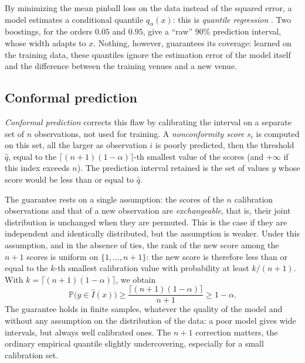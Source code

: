 \documentclass[11pt,a4paper]{article}
\begin{document}
By minimizing the mean pinball loss on the data instead of the squared error, a model estimates a conditional quantile
$\hat q_\alpha(x)$: this is \emph{quantile regression} \citep{koenker1978}. Two boostings, for the orders $0.05$ and
$0.95$, give a ``raw'' 90\% prediction interval, whose width adapts to $x$. Nothing, however, guarantees its coverage:
learned on the training data, these quantiles ignore the estimation error of the model itself and the difference
between the training venues and a new venue.

\subsection{Conformal prediction}\label{sec:conformal}

\emph{Conformal prediction} \citep{vovk2005} corrects this flaw by calibrating the interval on a separate set of $n$
observations, not used for training. A \emph{nonconformity score} $s_i$ is computed on this set, all the larger as
observation $i$ is poorly predicted, then the threshold $\hat q$, equal to the $\lceil (n+1)(1-\alpha)\rceil$-th
smallest value of the scores (and $+\infty$ if this index exceeds $n$). The prediction interval retained is the set of
values $y$ whose score would be less than or equal to $\hat q$.

The guarantee rests on a single assumption: the scores of the $n$ calibration observations and that of a new
observation are \emph{exchangeable}, that is, their joint distribution is unchanged when they are permuted. This is the
case if they are independent and identically distributed, but the assumption is weaker. Under this assumption, and in
the absence of ties, the rank of the new score among the $n + 1$ scores is uniform on $\{1, \dots, n + 1\}$: the new
score is therefore less than or equal to the $k$-th smallest calibration value with probability at least $k/(n + 1)$.
With $k = \lceil (n+1)(1-\alpha)\rceil$, we obtain
\begin{equation}\label{eq:conformal_guarantee}
\mathbb{P}\big(y \in \hat I(x)\big) \geq \frac{\lceil (n+1)(1-\alpha)\rceil}{n + 1} \geq 1 - \alpha .
\end{equation}
The guarantee holds in finite samples, whatever the quality of the model and without any assumption on the
distribution of the data: a poor model gives wide intervals, but always well calibrated ones. The $n + 1$ correction
matters, the ordinary empirical quantile slightly undercovering, especially for a small calibration set.
\end{document}
